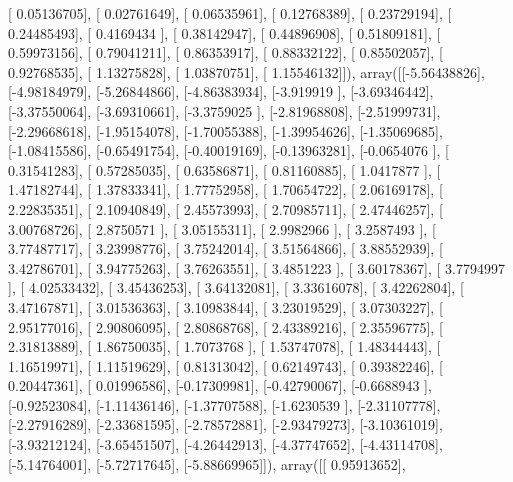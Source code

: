 \documentclass{article}
\begin{document}
       [ 0.05136705],
       [ 0.02761649],
       [ 0.06535961],
       [ 0.12768389],
       [ 0.23729194],
       [ 0.24485493],
       [ 0.4169434 ],
       [ 0.38142947],
       [ 0.44896908],
       [ 0.51809181],
       [ 0.59973156],
       [ 0.79041211],
       [ 0.86353917],
       [ 0.88332122],
       [ 0.85502057],
       [ 0.92768535],
       [ 1.13275828],
       [ 1.03870751],
       [ 1.15546132]]), array([[-5.56438826],
       [-4.98184979],
       [-5.26844866],
       [-4.86383934],
       [-3.919919  ],
       [-3.69346442],
       [-3.37550064],
       [-3.69310661],
       [-3.3759025 ],
       [-2.81968808],
       [-2.51999731],
       [-2.29668618],
       [-1.95154078],
       [-1.70055388],
       [-1.39954626],
       [-1.35069685],
       [-1.08415586],
       [-0.65491754],
       [-0.40019169],
       [-0.13963281],
       [-0.0654076 ],
       [ 0.31541283],
       [ 0.57285035],
       [ 0.63586871],
       [ 0.81160885],
       [ 1.0417877 ],
       [ 1.47182744],
       [ 1.37833341],
       [ 1.77752958],
       [ 1.70654722],
       [ 2.06169178],
       [ 2.22835351],
       [ 2.10940849],
       [ 2.45573993],
       [ 2.70985711],
       [ 2.47446257],
       [ 3.00768726],
       [ 2.8750571 ],
       [ 3.05155311],
       [ 2.9982966 ],
       [ 3.2587493 ],
       [ 3.77487717],
       [ 3.23998776],
       [ 3.75242014],
       [ 3.51564866],
       [ 3.88552939],
       [ 3.42786701],
       [ 3.94775263],
       [ 3.76263551],
       [ 3.4851223 ],
       [ 3.60178367],
       [ 3.7794997 ],
       [ 4.02533432],
       [ 3.45436253],
       [ 3.64132081],
       [ 3.33616078],
       [ 3.42262804],
       [ 3.47167871],
       [ 3.01536363],
       [ 3.10983844],
       [ 3.23019529],
       [ 3.07303227],
       [ 2.95177016],
       [ 2.90806095],
       [ 2.80868768],
       [ 2.43389216],
       [ 2.35596775],
       [ 2.31813889],
       [ 1.86750035],
       [ 1.7073768 ],
       [ 1.53747078],
       [ 1.48344443],
       [ 1.16519971],
       [ 1.11519629],
       [ 0.81313042],
       [ 0.62149743],
       [ 0.39382246],
       [ 0.20447361],
       [ 0.01996586],
       [-0.17309981],
       [-0.42790067],
       [-0.6688943 ],
       [-0.92523084],
       [-1.11436146],
       [-1.37707588],
       [-1.6230539 ],
       [-2.31107778],
       [-2.27916289],
       [-2.33681595],
       [-2.78572881],
       [-2.93479273],
       [-3.10361019],
       [-3.93212124],
       [-3.65451507],
       [-4.26442913],
       [-4.37747652],
       [-4.43114708],
       [-5.14764001],
       [-5.72717645],
       [-5.88669965]]), array([[ 0.95913652],
\end{document}
